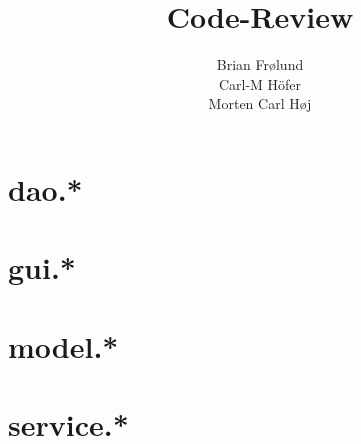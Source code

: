 \documentclass[a4paper,danish,10pt,onepage]{scrreprt}
\title{Code-Review}
\author{Brian Fr\o lund\\ Carl-M Höfer \\ Morten Carl H\o j}
\makeatletter
\renewcommand*{\lstlistoflistings}{%
  \begingroup
  \if@twocolumn
  \@restonecoltrue\onecolumn
  \else
  \@restonecolfalse
  \fi
  \lol@heading
  \setlength{\parskip}{\z@}%
  \setlength{\parindent}{\z@}%
  \setlength{\parfillskip}{\z@ \@plus 1fil}%
  \@starttoc{lol}%
  \if@restonecol\twocolumn\fi
  \endgroup
}
\makeatother
\begin{document}
  \maketitle
  \tableofcontents

  \chapter{dao.*}
  

  \chapter{gui.*}
  

  \chapter{model.*}
  

  \chapter{service.*}
  

\end{document}
